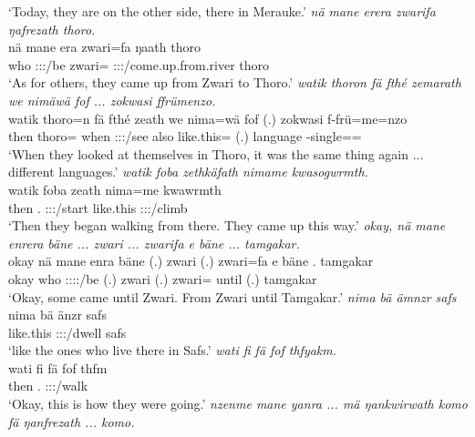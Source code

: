 \begin{exe}
	\trans `Today, they are on the other side, there in Merauke.'
	\emph{nä mane erera zwarifa ŋafrezath thoro.}\\
	\gll nä mane era zwari=fa ŋaath thoro\\ 
	\Indf{} who \Stpl:\Sbj:\Pst:\Ipfv/be zwari=\Abl{} \Stpl:\Sbj:\Pst:\Ipfv/come.up.from.river thoro\\
	\trans `As for others, they came up from Zwari to Thoro.'
	\emph{watik thoron fä fthé zemarath we nimäwä fof ... zokwasi ffrümenzo.}\\
	\gll watik thoro=n fä fthé zeath we nima=wä fof (.) zokwasi f-frü=me=nzo\\ 
	then thoro=\Loc{} \Dist{} when \Stpl:\Sbj:\Pst:\Ipfv/see also like.this=\Emph{} \Emph{} (.) language \Redup-single=\Ins=\Only\\
	\trans `When they looked at themselves in Thoro, it was the same thing again ... different languages.'
	\emph{watik foba zethkäfath nimame kwasogwrmth.}\\
	\gll watik foba zeath nima=me kwawrmth\\ 
	then \Dist.\Abl{} \Stpl:\Sbj:\Pst:\Ipfv/start like.this \Stpl:\Sbj:\Pst:\Dur/climb\\
	\trans `Then they began walking from there. They came up this way.'
	\emph{okay, nä mane enrera bäne ... zwari ... zwarifa e bäne ... tamgakar.}\\
	\gll okay nä mane enra bäne (.) zwari (.) zwari=fa e bäne . tamgakar\\ 
	okay \Indf{} who \Stpl:\Sbj:\Pst:\Ipfv:\Venit/be \Recog{} (.) zwari (.) zwari=\Abl{} until \Recog{} (.) tamgakar\\
	\trans `Okay, some came until Zwari. From Zwari until Tamgakar.'
	\emph{nima bä ämnzr safs}\\
	\gll nima bä änzr safs\\ 
	like.this \Med{} \Stpl:\Sbj:\Nonpast:\Ipfv/dwell safs\\
	\trans `like the ones who live there in Safs.'
	\emph{wati fi fä fof thfyakm.}\\
	\gll wati fi fä fof thfm\\ 
	then \Third.\Abs{} \Dist{} \Emph{} \Stpl:\Sbj:\Pst:\Dur/walk\\
	\trans `Okay, this is how they were going.'
	\emph{nzenme mane yanra ... mä ŋankwirwath komo fä ŋanfrezath ... komo.}\\

\end{exe}
